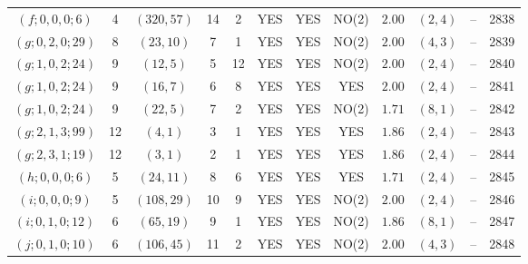 \begin{longtable}{|c|c|c|c|c|c|c|c|c|c|c|c|}
$(f;0,0,0;6)$ & 4 & $(320,57)$ & 14 & 2 & YES & YES & NO(2) & $2.00$ & $(2,4)$ & -- & 2838\\
$(g;0,2,0;29)$ & 8 & $(23,10)$ & 7 & 1 & YES & YES & NO(2) & $2.00$ & $(4,3)$ & -- & 2839\\
$(g;1,0,2;24)$ & 9 & $(12,5)$ & 5 & 12 & YES & YES & NO(2) & $2.00$ & $(2,4)$ & -- & 2840\\
$(g;1,0,2;24)$ & 9 & $(16,7)$ & 6 & 8 & YES & YES & YES & $2.00$ & $(2,4)$ & -- & 2841\\
$(g;1,0,2;24)$ & 9 & $(22,5)$ & 7 & 2 & YES & YES & NO(2) & $1.71$ & $(8,1)$ & -- & 2842\\
$(g;2,1,3;99)$ & 12 & $(4,1)$ & 3 & 1 & YES & YES & YES & $1.86$ & $(2,4)$ & -- & 2843\\
$(g;2,3,1;19)$ & 12 & $(3,1)$ & 2 & 1 & YES & YES & YES & $1.86$ & $(2,4)$ & -- & 2844\\
$(h;0,0,0;6)$ & 5 & $(24,11)$ & 8 & 6 & YES & YES & YES & $1.71$ & $(2,4)$ & -- & 2845\\
$(i;0,0,0;9)$ & 5 & $(108,29)$ & 10 & 9 & YES & YES & NO(2) & $2.00$ & $(2,4)$ & -- & 2846\\
$(i;0,1,0;12)$ & 6 & $(65,19)$ & 9 & 1 & YES & YES & NO(2) & $1.86$ & $(8,1)$ & -- & 2847\\
$(j;0,1,0;10)$ & 6 & $(106,45)$ & 11 & 2 & YES & YES & NO(2) & $2.00$ & $(4,3)$ & -- & 2848
\end{longtable}
